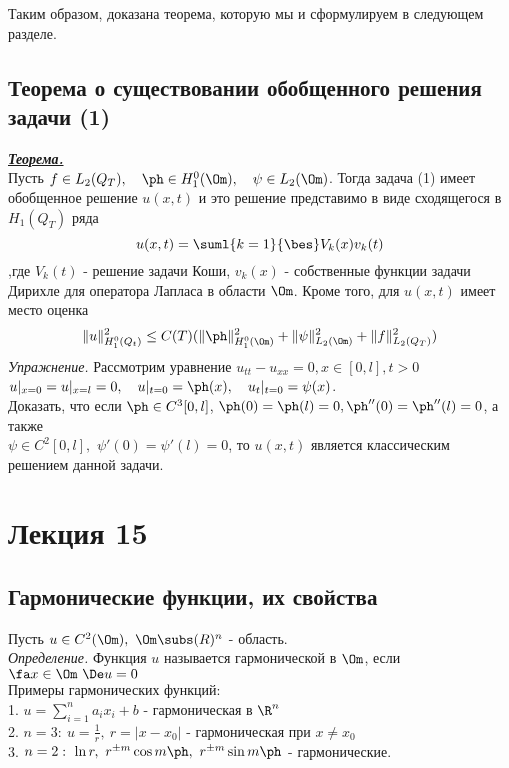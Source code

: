 \documentclass[a4paper,draft]{article}
\begin{document}
Таким образом, доказана теорема, которую мы и сформулируем в
следующем разделе.

\subsection{Теорема о существовании обобщенного решения задачи (1)}
\textbf{\underline{\textit{Теорема.}}}\\
Пусть $f\in L_2(Q_T),\quad \ph\in H_1^0(\Om),\quad\psi\in
L_2(\Om)$. Тогда задача (1) имеет обобщенное решение $u(x,t)$ и
это решение представимо в виде сходящегося в $H_1(Q_T)$ ряда
$$
u(x,t)=\suml{k=1}{\bes}V_k(x)v_k(t)
$$
,где $V_k(t)$ - решение задачи Коши, $v_k(x)$ - собственные
функции задачи Дирихле для оператора Лапласа в области $\Om$.
Кроме того, для $u(x,t)$ имеет место оценка
$$
\|u\|^2_{H_1^0(Q_t)}\le
C(T)(\|\ph\|^2_{H_1^0(\Om)}+\|\psi\|^2_{L_2(\Om)}+\|f\|^2_{L_2(Q_T)})
$$
\textit{Упражнение.} Рассмотрим уравнение $u_{tt}-u_{xx}=0,x\in
[0,l],t>0$\\
$u|_{x=0}=u|_{x=l}=0,\quad u|_{t=0}=\ph(x),\quad
u_t|_{t=0}=\psi(x)$.\\
Доказать, что если $\ph\in C^3[0,l]$,
$\ph(0)=\ph(l)=0, \ph''(0)=\ph''(l)=0$, а
также\\
$\psi\in C^2[0,l],$ $\psi'(0)=\psi'(l)=0$, то $u(x,t)$ является
классическим решением данной задачи.






\section{Лекция 15}
\subsection{Гармонические функции, их свойства}

Пусть $u\in C^2(\Om),\ \Om\subs\mathbb(R)^n$ - область.\\
\textit{Определение.} Функция $u$ называется гармонической в $\Om$, если $\fa x\in\Om\ \De u =0$\\
Примеры гармонических функций:\\
1. $u=\sum\limits_{i=1}^n a_ix_i+b$ - гармоническая в $\R^n$\\
2. $n=3:\ u=\frac{1}{r},\ r=|x-x_0|$ - гармоническая при $x\neq x_0$\\
3. $n=2:\ \ln{r},\ r^{\pm m} \cos{m\ph},\ r^{\pm m} \sin{m\ph}$ -  гармонические.
\end{document}
